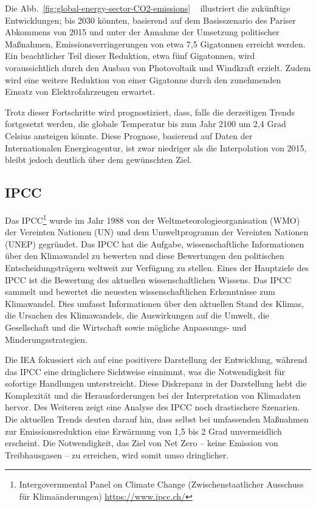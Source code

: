 \documentclass{article}
\begin{document}
Die Abb.~\ref{fig:global-energy-sector-CO2-emissions} ~ illustriert die zukünftige Entwicklungen;  bis 2030 könnten, basierend auf dem Basisszenario des Pariser Abkommens von 2015 und unter der Annahme der Umsetzung politischer Maßnahmen, Emissionsverringerungen von etwa 7,5 Gigatonnen erreicht werden. Ein beachtlicher Teil dieser Reduktion, etwa fünf Gigatonnen, wird voraussichtlich durch den Ausbau von Photovoltaik und Windkraft erzielt. Zudem wird eine weitere Reduktion von einer Gigatonne durch den zunehmenden Einsatz von Elektrofahrzeugen erwartet.

Trotz dieser Fortschritte wird prognostiziert, dass, falls die derzeitigen Trends fortgesetzt werden, die globale Temperatur bis zum Jahr 2100 um 2,4 Grad Celsius ansteigen könnte. Diese Prognose, basierend auf Daten der Internationalen Energieagentur, ist zwar niedriger als die Interpolation von 2015, bleibt jedoch deutlich über dem gewünschten Ziel. 


 \subsection*{IPCC}
Das IPCC\footnote{%
         Intergovernmental Panel on Climate Change (Zwischenstaatlicher Ausschuss für Klimaänderungen)
				\href{https://www.ipcc.ch/}{https://www.ipcc.ch/}} 
wurde im Jahr 1988 von der Weltmeteorologieorganisation (WMO) der Vereinten Nationen (UN) und dem Umweltprogramm der Vereinten Nationen (UNEP) gegründet. Das IPCC hat die Aufgabe, wissenschaftliche Informationen über den Klimawandel zu bewerten und diese Bewertungen den politischen Entscheidungsträgern weltweit zur Verfügung zu stellen.
Eines der Hauptziele des IPCC ist die 
Bewertung des aktuellen wissenschaftlichen Wissens. Das IPCC sammelt und bewertet die neuesten wissenschaftlichen Erkenntnisse zum Klimawandel. Dies umfasst Informationen über den aktuellen Stand des Klimas, die Ursachen des Klimawandels, die Auswirkungen auf die Umwelt, die Gesellschaft und die Wirtschaft sowie mögliche Anpassungs- und Minderungsstrategien.



Die IEA fokussiert sich auf eine positivere Darstellung der Entwicklung, während das IPCC eine  dringlichere Sichtweise einnimmt, was die Notwendigkeit für sofortige Handlungen unterstreicht. Diese Diskrepanz in der Darstellung hebt die Komplexität und die Herausforderungen bei der Interpretation von Klimadaten hervor.
Des Weiteren zeigt eine Analyse des IPCC noch drastischere Szenarien. Die aktuellen Trends deuten darauf hin, dass selbst bei umfassenden Maßnahmen zur Emissionsreduktion eine Erwärmung von 1,5 bis 2 Grad unvermeidlich erscheint. Die Notwendigkeit, das Ziel von Net Zero – keine Emission von Treibhausgasen – zu erreichen, wird somit umso dringlicher.
\end{document}
